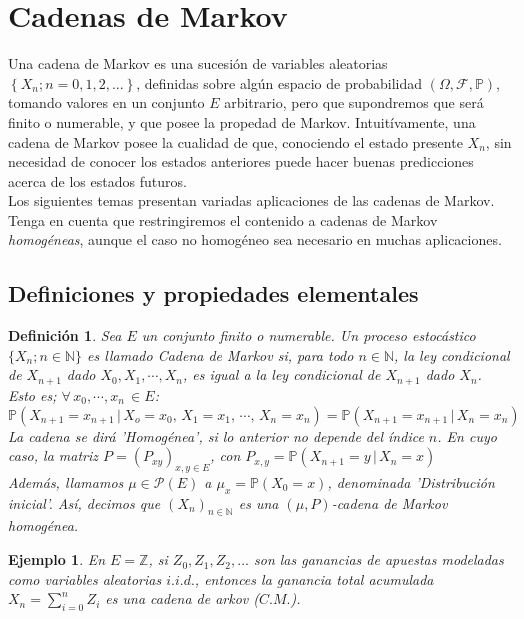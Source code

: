 \documentclass[a4paper]{article}
\newcommand{\prob}{\mathbb{P}}
\newtheorem{definicion}{Definición}
\newtheorem{ejemplo}{Ejemplo}
\numberwithin{equation}{subsection}
\def\N{\mathbb N}
\def\Z{\mathbb Z}
\begin{document}
\section{Cadenas de Markov}
Una cadena de Markov es una sucesión de variables aleatorias $\left\{X_n;n=0,1,2,...\right\}$, definidas sobre algún espacio de probabilidad $\left(\Omega,\mathcal{
F}, \prob\right)$, tomando valores en un conjunto $E$ arbitrario, pero que supondremos que será finito o numerable, y que posee la propedad de Markov. Intuitívamente, una cadena de Markov posee la cualidad de que, conociendo el estado presente $X_n$, sin necesidad de conocer los estados anteriores puede hacer buenas predicciones acerca de los estados futuros.\\ Los siguientes temas presentan variadas aplicaciones de las cadenas de Markov. Tenga en cuenta que restringiremos el contenido a cadenas de Markov \textit{homogéneas}, aunque el caso no homogéneo sea necesario en muchas aplicaciones.

\subsection{Definiciones y propiedades elementales}

\begin{definicion}
Sea $E$ un conjunto finito o numerable. Un proceso estocástico $\{X_n;n\in \N\}$ es llamado \textit{Cadena de Markov} si, para todo $n\in\N$, la ley condicional de $X_{n+1}$ dado $X_0,X_1,\cdots,X_n$, es igual a la ley condicional de $X_{n+1}$ dado $X_n$.\\ \newline Esto es; $\forall\,x_0,\cdots,x_n\,\in E$:
\[\prob\left(X_{n+1}=x_{n+1}\,|\,X_o = x_0,\,X_1=x_1,\,\cdots,\,X_n=x_n\right) = \prob\left(X_{n+1}=x_{n+1}\,|\,X_n=x_n\right)\]
La cadena se dirá 'Homogénea', si lo anterior no depende del índice $n$. En cuyo caso, la matriz $P=\left(P_{xy}\right)_{x,y\in E}$, con $P_{x,y} = \prob\left(X_{n+1}=y\,|\,X_n = x\right)$\\ \newline
Además, llamamos $\mu\in \mathcal{P}(E)$ a $\mu_x = \prob(X_0 = x)$, denominada 'Distribución inicial'. Así, decimos que $\left(X_n\right)_{n\in\N}$ es una $(\mu,P)$-cadena de Markov homogénea.
\end{definicion}

\begin{ejemplo}
En $E=\Z$, si $Z_0,Z_1,Z_2,...$ son las ganancias de apuestas modeladas como variables aleatorias $i.i.d.$, entonces la ganancia total acumulada $X_n = \sum_{i=0}^nZ_i$ es una cadena de arkov ($C.M.$).
\end{ejemplo}
\end{document}
